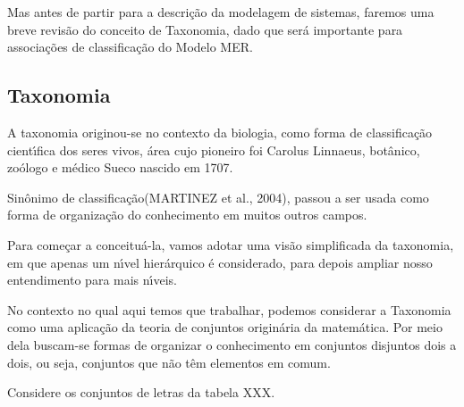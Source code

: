 \documentclass[
12pt,		%
openright,	%
twoside,  %
a4paper,			%
chapter=TITLE,		%
english,			%
french,				%
spanish,			%
brazil				%
]{USPSC-classe/USPSC}
\begin{document}
Mas antes de partir para a descri\c{c}\~ao da modelagem de sistemas, faremos uma breve revis\~ao do conceito de Taxonomia, dado que ser\'a importante para associa\c{c}\~oes de classifica\c{c}\~ao do Modelo MER.









\subsection[Taxonomia]{Taxonomia}\label{Taxonomia}
A taxonomia originou-se no contexto da biologia, como forma de classifica\c{c}\~ao cient\'{\i}fica dos seres vivos, \'area cujo pioneiro foi Carolus Linnaeus, bot\^anico, zo\'ologo e m\'edico Sueco nascido em 1707.









Sin\^onimo de \textquotedbl classifica\c{c}\~ao\textquotedbl   (MARTINEZ et al., 2004), passou a ser usada como forma de organiza\c{c}\~ao do conhecimento em muitos outros campos.









Para come\c{c}ar a conceitu\'a-la, vamos adotar uma vis\~ao simplificada da taxonomia, em que apenas um n\'{\i}vel hier\'arquico \'e considerado, para depois ampliar nosso entendimento para mais n\'{\i}veis.









No contexto no qual aqui temos que trabalhar, podemos considerar a Taxonomia como uma aplica\c{c}\~ao da teoria de conjuntos origin\'aria da matem\'atica. Por meio dela buscam-se formas de organizar o conhecimento em \textquotedbl conjuntos disjuntos dois a dois\textquotedbl , ou seja, conjuntos que n\~ao t\^em elementos em comum.









Considere os conjuntos de letras da tabela XXX.
\end{document}
